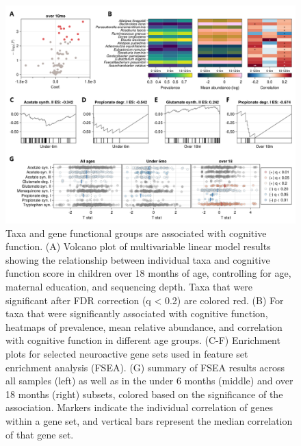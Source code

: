 \documentclass[a4paper]{article}
\begin{document}
\begin{figure}
    \centering
    \includegraphics[width=\textwidth]{assets/Figure2.png}
    \caption{
        Taxa and gene functional groups are associated with cognitive function.
        (A) Volcano plot of multivariable linear model results showing the
        relationship between individual taxa and cognitive function score in
        children over 18 months of age, controlling for age, maternal education,
        and sequencing depth. Taxa that were significant after FDR correction (q
        \textless{} 0.2) are colored red. (B) For taxa that were significantly
        associated with cognitive function, heatmaps of prevalence, mean
        relative abundance, and correlation with cognitive function in different
        age groups. (C-F) Enrichment plots for selected neuroactive gene sets
        used in feature set enrichment analysis (FSEA). (G) summary of FSEA
        results across all samples (left) as well as in the under 6 months
        (middle) and over 18 months (right) subsets, colored based on the
        significance of the association. Markers indicate the individual
        correlation of genes within a gene set, and vertical bars represent the
        median correlation of that gene set.
    }
    \label{fig:Figure 2}
\end{figure}
\end{document}
